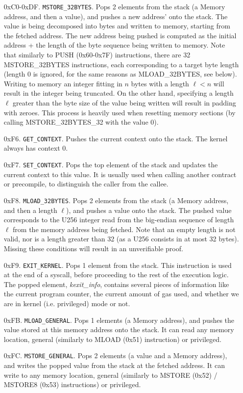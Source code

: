 \begin{enumerate}[align=left]
  \item[0xC0-0xDF.] \texttt{MSTORE\_32BYTES}. Pops 2 elements from the stack (a Memory address, and then a value), and pushes
  a new address' onto the stack. The value is being decomposed into bytes and written to memory, starting from the fetched address. The new address being pushed is computed as the
  initial address + the length of the byte sequence being written to memory. Note that similarly to PUSH (0x60-0x7F) instructions, there are 32 MSTORE\_32BYTES instructions, each
  corresponding to a target byte length (length 0 is ignored, for the same reasons as MLOAD\_32BYTES, see below). Writing to memory an integer fitting in $n$ bytes with a length $\ell < n$ will
  result in the integer being truncated. On the other hand, specifying a length $\ell$ greater than the byte size of the value being written will result in padding with zeroes. This
  process is heavily used when resetting memory sections (by calling MSTORE\_32BYTES\_32 with the value 0).

  \item[0xF6.] \texttt{GET\_CONTEXT}. Pushes the current context onto the stack. The kernel always has context 0.

  \item[0xF7.] \texttt{SET\_CONTEXT}. Pops the top element of the stack and updates the current context to this value. It is usually used when calling another contract or precompile,
  to distinguish the caller from the callee.

  \item[0xF8.] \texttt{MLOAD\_32BYTES}. Pops 2 elements from the stack (a Memory address, and then a length $\ell$), and pushes
  a value onto the stack. The pushed value corresponds to the U256 integer read from the big-endian sequence of length $\ell$ from the memory address being fetched. Note that an
  empty length is not valid, nor is a length greater than 32 (as a U256 consists in at most 32 bytes). Missing these conditions will result in an unverifiable proof.

  \item[0xF9.] \texttt{EXIT\_KERNEL}. Pops 1 element from the stack. This instruction is used at the end of a syscall, before proceeding to the rest of the execution logic.
  The popped element, \textit{kexit\_info}, contains several pieces of information like the current program counter, the current amount of gas used, and whether we are in kernel (i.e. privileged) mode or not.

  \item[0xFB.] \texttt{MLOAD\_GENERAL}. Pops 1 elements (a Memory address), and pushes the value stored at this memory
  address onto the stack. It can read any memory location, general (similarly to MLOAD (0x51) instruction) or privileged.

  \item[0xFC.] \texttt{MSTORE\_GENERAL}. Pops 2 elements (a value and a Memory address), and writes the popped value from
  the stack at the fetched address. It can write to any memory location, general (similarly to MSTORE (0x52) / MSTORE8 (0x53) instructions) or privileged.
\end{enumerate}


